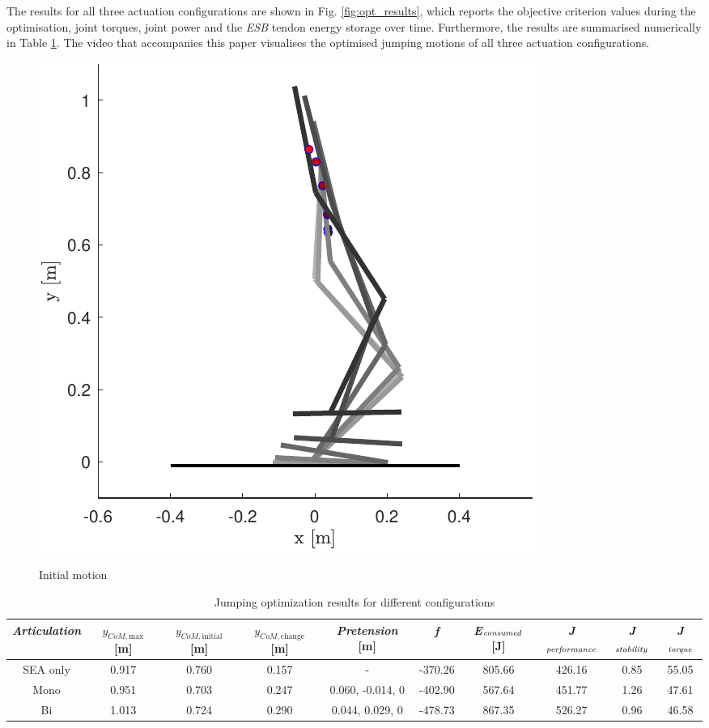 \documentclass[letterpaper, 10 pt, conference]{ieeeconf}  %
\begin{document}
The results for all three actuation configurations are shown in Fig. \ref{fig:opt_results}, which reports the objective criterion values during the optimisation, joint torques, joint power and the \textit{ESB} tendon energy storage over time. Furthermore, the results are summarised numerically in Table \ref{table:maxheight}. The video that accompanies this paper visualises the optimised jumping motions of all three actuation configurations.

\begin{figure}[b]
	\centering
	{\includegraphics[scale=0.6]{initialguess}
	}%
	\caption{Initial motion} \label{fig:seq}	
\end{figure}

\begin{table}[ht]
	\caption{Jumping optimization results for different configurations}
	\label{table:maxheight}
	\begin{center}
		\begin{tabular}[t]{c|c|c||c|c|c|c|c|c|c}
			\textit{Articulation} &  $y_{CoM,\text{max}}$ [m] & $y_{CoM,\text{initial}}$ [m]& $y_{CoM,\text{change}}$ [m]& \textit{Pretension} [m] & \textit{f} & \textit{E}$_{\text{\textit{consumed}}}$ [J] & \textit{J}$_{\text{\textit{performance}}}$ & \textit{J}$_{\text{\textit{stability}}}$ & \textit{J}$_{\text{\textit{torque}}}$\\ 
			\hline
			SEA only& 0.917 &0.760  &0.157 &- &-370.26  & 805.66 & 426.16  &0.85  &   55.05\\
			\hline
			Mono &0.951 &0.703 &0.247 &  0.060, -0.014, 0  & -402.90 & 567.64& 451.77 & 1.26 &47.61 \\
			\hline
			Bi &1.013 &0.724 &0.290 &  0.044, 0.029, 0 & -478.73 & 867.35 & 526.27 & 0.96 & 46.58
		\end{tabular}
	\end{center}
\end{table}
\end{document}
